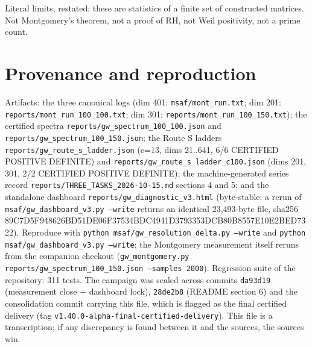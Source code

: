 \documentclass[11pt]{article}
\begin{document}
Literal limits, restated: these are statistics of a finite set of
constructed matrices. Not Montgomery's theorem, not a proof of RH, not
Weil positivity, not a prime count.

\section{Provenance and reproduction}
Artifacts: the three canonical logs (dim 401:
\texttt{msaf/mont\_run.txt}; dim 201:
\texttt{reports/mont\_run\_100\_100.txt}; dim 301:
\texttt{reports/mont\_run\_100\_150.txt}); the certified spectra
\texttt{reports/gw\_spectrum\_100\_100.json} and
\texttt{reports/gw\_spectrum\_100\_150.json}; the Route S ladders
\texttt{reports/gw\_route\_s\_ladder.json} (c=13, dims 21..641, 6/6
CERTIFIED POSITIVE DEFINITE) and
\texttt{reports/gw\_route\_s\_ladder\_c100.json} (dims 201, 301, 2/2
CERTIFIED POSITIVE DEFINITE); the machine-generated series record
\texttt{reports/THREE\_TASKS\_2026-10-15.md} sections 4 and 5; and the
standalone dashboard \texttt{reports/gw\_diagnostic\_v3.html}
(byte-stable: a rerun of \texttt{msaf/gw\_dashboard\_v3.py --write}
returns an identical 23{,}493-byte file, sha256
89C7D5F948626BD51DE06F37534BDC4941D3793353DCB80B8557E10E2BED7322).
Reproduce with \texttt{python msaf/gw\_resolution\_delta.py --write} and
\texttt{python msaf/gw\_dashboard\_v3.py --write}; the Montgomery
measurement itself reruns from the companion checkout
(\texttt{gw\_montgomery.py reports/gw\_spectrum\_100\_150.json
--samples 2000}). Regression suite of the repository: 311 tests. The
campaign was sealed across commits \texttt{da93d19} (measurement close
+ dashboard lock), \texttt{28de2b8} (README section 6) and the
consolidation commit carrying this file, which is flagged as the final
certified delivery (tag \texttt{v1.40.0-alpha-final-certified-delivery}).
This file is a transcription; if any discrepancy is found between it
and the sources, the sources win.
\end{document}
